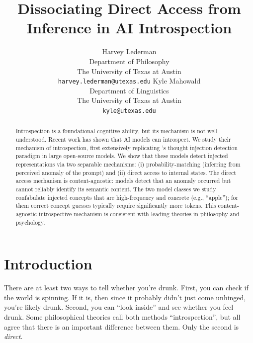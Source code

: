 \documentclass{article}
\author{Harvey Lederman \\ 
Department of Philosophy \\
The University of Texas at Austin \\
  \texttt{harvey.lederman@utexas.edu}
\And
Kyle Mahowald \\
Department of Linguistics\\
  The University of Texas at Austin\\
  \texttt{kyle@utexas.edu}}
\title{Dissociating Direct Access from Inference in AI Introspection}
\begin{document}
\ifcolmsubmission
\linenumbers
\fi

\maketitle

\begin{abstract}
Introspection
is a foundational cognitive ability, but its mechanism is not well understood. Recent work has shown that AI models can introspect.
We study their mechanism of introspection, first extensively replicating \citet{lindsey_introspection_2025}'s 
thought injection detection paradigm in large open-source models.
We show that these models detect injected representations via two separable mechanisms: (i) probability-matching (inferring from perceived anomaly of the prompt) and (ii) direct access to internal states. The direct access mechanism is content-agnostic: models detect that an anomaly occurred but cannot reliably identify its semantic content.
The two model classes we study confabulate injected concepts that are high-frequency and concrete (e.g., ``apple''); for them correct concept guesses typically require  significantly more tokens.
This content-agnostic introspective mechanism is consistent with leading theories in philosophy and psychology.
\end{abstract}

\vspace{-.1in}
\section{Introduction}



There are at least two ways to tell whether you're drunk. First, you can check if the world is spinning. If it is, then since it probably didn't just come unhinged, you're likely drunk. Second, you can ``look inside'' and see whether you feel drunk. Some philosophical theories call both methods ``introspection'', but all agree that there is an important difference between them. Only the second is \emph{direct}.
\end{document}
